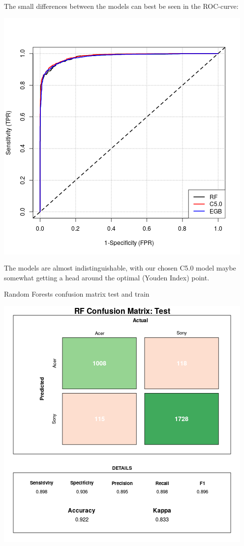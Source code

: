 \documentclass[12pt,a4paper,leqno]{report}
\theoremstyle{plain}
\theoremstyle{definition}
\theoremstyle{remark}
\begin{document}
The small differences between the models can best be seen in the ROC-curve:

\bigskip
{
    \centering
    \includegraphics[width=\textwidth,height=\textheight,keepaspectratio]{AUC_comparison.png}
    \par
}
\bigskip

The models are almost indistinguishable, with our chosen C5.0 model maybe somewhat getting a head around
the optimal (Youden Index) point.

Random Forests confusion matrix test and train

\bigskip
{
    \centering
    \includegraphics[width=\textwidth,height=\textheight,keepaspectratio]{cm_rf.png}
    \par
}
\bigskip
\end{document}
